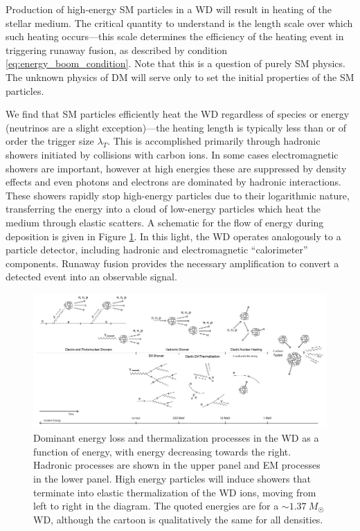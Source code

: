 Production of high-energy SM particles in a WD will result in heating of the stellar medium.
The critical quantity to understand is the length scale over which such heating occurs---this scale determines the efficiency of the heating event in triggering runaway fusion, as described by condition \eqref{eq:energy_boom_condition}.
Note that this is a question of purely SM physics.
The unknown physics of DM will serve only to set the initial properties of the SM particles.

We find that SM particles efficiently heat the WD regardless of species or energy (neutrinos are a slight exception)---the heating length is typically less than or of order the trigger size $\lambda_T$.
This is accomplished primarily through hadronic showers initiated by collisions with carbon ions.
In some cases electromagnetic showers are important, however at high energies these are suppressed by density effects and even photons and electrons are dominated by hadronic interactions.
These showers rapidly stop high-energy particles due to their logarithmic nature, transferring the energy into a cloud of low-energy particles which heat the medium through elastic scatters.
A schematic for the flow of energy during deposition is given in Figure \ref{fig:cooling-cartoon}.
In this light, the WD operates analogously to a particle detector, including hadronic and electromagnetic ``calorimeter'' components.
Runaway fusion provides the necessary amplification to convert a detected event into an observable signal.

\begin{figure}
\includegraphics[scale=1.15]{cooling-cartoon.pdf}
\caption{Dominant energy loss and thermalization processes in the WD as a function of energy, with energy decreasing towards the right.
Hadronic processes are shown in the upper panel and EM processes in the lower panel.
High energy particles will induce showers that terminate into elastic thermalization of the WD ions, moving from left to right in the diagram.
The quoted energies are for a $\sim 1.37 ~M_{\astrosun}$ WD, although the cartoon is qualitatively the same for all densities.}
\label{fig:cooling-cartoon}
\end{figure}



